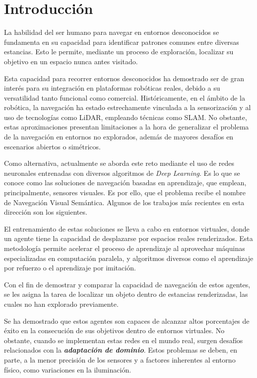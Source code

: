 \chapter{Introducción}\label{ch:introduccion}

La habilidad del ser humano para navegar en entornos desconocidos se fundamenta en su capacidad para identificar patrones comunes entre diversas estancias.
Esto le permite, mediante un proceso de exploración, localizar su objetivo en un espacio nunca antes visitado.

Esta capacidad para recorrer entornos desconocidos ha demostrado ser de gran interés para su integración en plataformas robóticas reales, debido a su versatilidad tanto funcional como comercial.
Históricamente, en el ámbito de la robótica, la navegación ha estado estrechamente vinculada a la sensorización y al uso de tecnologías como \ac{LiDAR}, empleando técnicas como \ac{SLAM}.
No obstante, estas aproximaciones presentan limitaciones a la hora de generalizar el problema de la navegación en entornos no explorados, además de mayores desafíos en escenarios abiertos o simétricos.

Como alternativa, actualmente se aborda este reto mediante el uso de redes neuronales entrenadas con diversos algoritmos de \textit{Deep Learning}.
Es lo que se conoce como las soluciones de navegación basadas en aprendizaje, que emplean, principalmente, sensores visuales.
Es por ello, que el problema recibe el nombre de Navegación Visual Semántica.
Algunos de los trabajos más recientes en esta dirección son los siguientes\citep{ramrakhya2023,zhang2022,Huang2023}.

El entrenamiento de estas soluciones se lleva a cabo en entornos virtuales, donde un agente tiene la capacidad de desplazarse por espacios reales renderizados.
Esta metodología permite acelerar el proceso de aprendizaje al aprovechar máquinas especializadas en computación paralela, y algoritmos diversos como el aprendizaje por refuerzo o el aprendizaje por imitación.

Con el fin de demostrar y comparar la capacidad de navegación de estos agentes, se les asigna la tarea de localizar un objeto dentro de estancias renderizadas, las cuales no han explorado previamente.

Se ha demostrado que estos agentes son capaces de alcanzar altos porcentajes de éxito en la consecución de sus objetivos dentro de entornos virtuales.
No obstante, cuando se implementan estas redes en el mundo real, surgen desafíos relacionados con la \textit{\textbf{adaptación de dominio}}.
Estos problemas se deben, en parte, a la menor precisión de los sensores y a factores inherentes al entorno físico, como variaciones en la iluminación.

